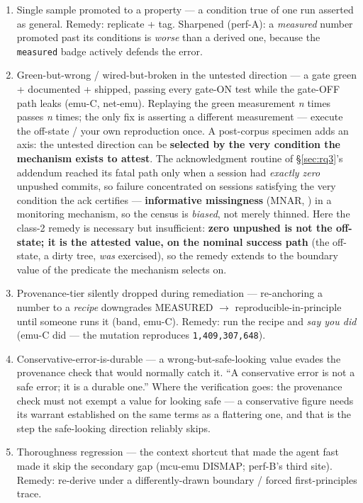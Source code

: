 \documentclass[10pt,conference]{IEEEtran}   %
\begin{document}
\begin{enumerate}
\item Single sample promoted to a property --- a condition true of one run asserted as
  general. Remedy: replicate + tag. Sharpened (perf-A): a \emph{measured} number
  promoted past its conditions is \emph{worse} than a derived one, because the \texttt{measured}
  badge actively defends the error.
\item Green-but-wrong / wired-but-broken in the untested direction --- a gate green +
  documented + shipped, passing every gate-ON test while the gate-OFF path leaks (emu-C,
  net-emu). Replaying the green measurement \emph{n} times passes \emph{n} times; the only fix
  is asserting a different measurement --- execute the off-state / your own
  reproduction once.
  A post-corpus specimen adds an axis: the untested direction can be \textbf{selected by the very
  condition the mechanism exists to attest}. The acknowledgment routine of \S\ref{sec:rq3}'s addendum
  reached its fatal path only when a session had \emph{exactly zero} unpushed commits, so failure
  concentrated on sessions satisfying the very condition the ack certifies --- \textbf{informative
  missingness} (MNAR, \cite{rubin1976}) in a monitoring mechanism, so the census is \emph{biased},
  not merely thinned. Here the class-2 remedy is necessary but insufficient: \textbf{zero unpushed
  is not the off-state; it is the attested value, on the nominal success path} (the off-state, a
  dirty tree, \emph{was} exercised), so the remedy extends to the boundary value of the predicate
  the mechanism selects on.
\item Provenance-tier silently dropped during remediation --- re-anchoring a number to
  a \emph{recipe} downgrades MEASURED $\rightarrow$ reproducible-in-principle until someone runs
  it (band, emu-C). Remedy: run the recipe and \emph{say you did} (emu-C did --- the
  mutation reproduces \texttt{1,409,307,648}).
\item Conservative-error-is-durable --- a wrong-but-safe-looking value evades the
  provenance check that would normally catch it. ``A conservative error is not a safe error; it
  is a durable one.'' Where the verification goes: the provenance check must not exempt a value for
  looking safe --- a conservative figure needs its warrant established on the same terms as a
  flattering one, and that is the step the safe-looking direction reliably skips.
\item Thoroughness regression --- the context shortcut that made the agent fast made
  it skip the secondary gap (mcu-emu DISMAP; perf-B's third site). Remedy: re-derive under a
  differently-drawn boundary / forced first-principles trace.
\end{enumerate}
\end{document}

